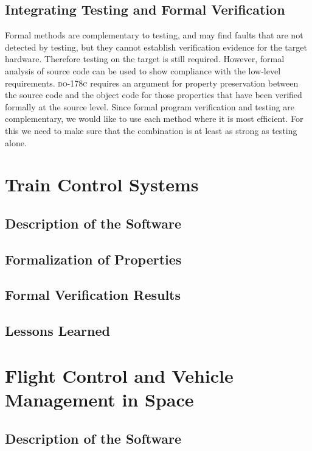 \documentclass{article}
\newcommand{\DOC}{\textsc{do-178c}\xspace}
\begin{document}
\subsection{Integrating Testing and Formal Verification}

Formal methods are complementary to testing, and may find faults that
are not detected by testing, but they cannot establish verification
evidence for the target hardware. Therefore testing on the target is
still required. However, formal analysis of source code can be used to
show compliance with the low-level requirements. \DOC requires an
argument for property preservation between the source code and the
object code for those properties that have been verified formally at
the source level. Since formal program verification and testing are
complementary, we would like to use each method where it is most
efficient. For this we need to make sure that the combination is at
least as strong as testing alone.

\section{Train Control Systems}


\subsection{Description of the Software}
\subsection{Formalization of Properties}
\subsection{Formal Verification Results}
\subsection{Lessons Learned}

\section{Flight Control and Vehicle Management in Space}


\subsection{Description of the Software}
\end{document}
